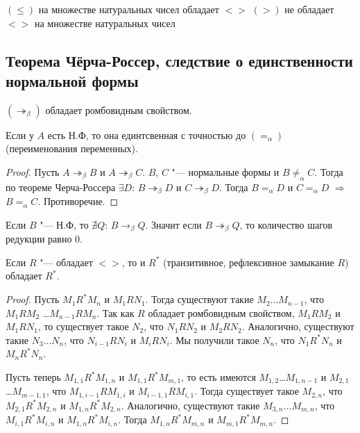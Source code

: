 \begin{example}
	$(\leq)$ на множестве натуральных чисел обладает $<>$
	$(>)$ не обладает $<>$ на множестве натуральных чисел 
\end{example}

\subsection{Теорема Чёрча-Россер, следствие о единственности нормальной формы}

\begin{theorem}
	$(\twoheadrightarrow_{\beta})$ обладает ромбовидным свойством.
\end{theorem}


\begin{cons}
	Если у $A$ есть Н.Ф, то она единтсвенная с точностью до $(=_{\alpha})$ (переименования переменных).
\end{cons}

\begin{proof}
	Пусть $A\twoheadrightarrow_{\beta}B$ и $A\twoheadrightarrow_{\beta}C$. $B$, $C$ "--- нормальные формы и $B\neq_{\alpha}C$. 
	Тогда по теореме Черча-Россера $\exists{}D$: $B\twoheadrightarrow_{\beta}D$ и $C\twoheadrightarrow_{\beta}D$. Тогда $B=_{\alpha}D$ и $C=_{\alpha} D$ $\Rightarrow$ $B=_{\alpha}C$. Противоречие.
\end{proof}

\begin{lemma}
	Если $B$ "--- Н.Ф, то $\nexists{}Q$: $B\to_{\beta}Q$. Значит если $B\twoheadrightarrow_{\beta}Q$, то количество шагов редукции равно 0.
\end{lemma}

\begin{lemma}
	 \label{refl}
	Если $R$ "--- обладает $<>$, то и $R^{*}$ (транзитивное, рефлексивное замыкание $R$) обладает $R^{*}$.
\end{lemma}

\begin{proof}
    Пусть $M_1 R^{*} M_n$ и $M_1 R N_1$. Тогда существуют такие $M_2 \ldots M_{n-1}$, что $M_1 R M_2$ \ldots $M_{n-1} R M_n$.
	Так как $R$ обладает ромбовидным свойством, $M_1 R M_2$ и $M_1 R N_1$, то существует такое $N_2$,
	что $N_1 R N_2$ и $M_2 R N_2$. Аналогично, существуют такие $N_3 \ldots N_n$, что $N_{i-1} R N_{i}$ и $M_i R N_i$.
	Мы получили такое $N_n$, что $N_1 R^{*} N_n$ и $M_n R^{*} N_n$.
	
	Пусть теперь $M_{1,1}R^{*}M_{1,n}$ и $M_{1,1}R^{*}M_{m,1}$, то есть имеются $M_{1,2}$\ldots$M_{1,n-1}$ и $M_{2,1}$\ldots$M_{m-1,1}$,
	что $M_{1,i-1} R M_{1,i}$ и $M_{i-1, 1} R M_{i, 1}$.
	Тогда существует такое $M_{2,n}$, что $M_{2,1} R^{*} M_{2,n}$ и $M_{1,n} R^{*} M_{2,n}$.
	Аналогично, существуют такие $M_{3,n}\ldots M_{m,n}$, что $M_{i,1} R^{*} M_{i,n}$ и $M_{1,n} R^{*} M_{i,n}$.
	Тогда $M_{1,n} R^{*} M_{m,n}$ и $M_{m,1} R^{*} M_{m,n}$.
\end{proof}

